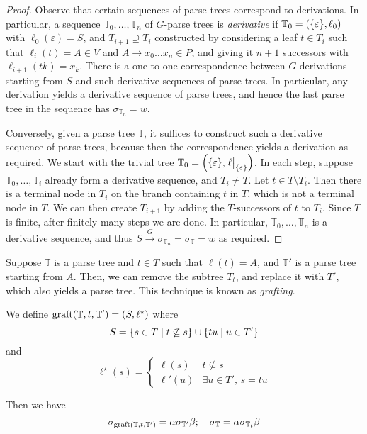 \begin{proof}
	Observe that certain sequences of parse trees correspond to derivations.
	In particular, a sequence \( \mathbb T_0, \dots, \mathbb T_n \) of \( G \)-parse trees is \emph{derivative} if \( \mathbb T_0 = (\qty{\varepsilon}, \ell_0) \) with \( \ell_0(\varepsilon) = S \), and \( T_{i+1} \supseteq T_i \) constructed by considering a leaf \( t \in T_i \) such that \( \ell_i(t) = A \in V \) and \( A \to x_0 \dots x_n \in P \), and giving it \( n + 1 \) successors with \( \ell_{i+1}(tk) = x_k \).
	There is a one-to-one correspondence between \( G \)-derivations starting from \( S \) and such derivative sequences of parse trees.
	In particular, any derivation yields a derivative sequence of parse trees, and hence the last parse tree in the sequence has \( \sigma_{\mathbb T_n} = w \).

	Conversely, given a parse tree \( \mathbb T \), it suffices to construct such a derivative sequence of parse trees, because then the correspondence yields a derivation as required.
	We start with the trivial tree \( \mathbb T_0 = \qty(\qty{\varepsilon}, \eval{\ell}_{\qty{\varepsilon}}) \).
	In each step, suppose \( \mathbb T_0, \dots, \mathbb T_i \) already form a derivative sequence, and \( T_i \neq T \).
	Let \( t \in T \setminus T_i \).
	Then there is a terminal node in \( T_i \) on the branch containing \( t \) in \( T \), which is not a terminal node in \( T \).
	We can then create \( T_{i+1} \) by adding the \( T \)-successors of \( t \) to \( T_i \).
	Since \( T \) is finite, after finitely many steps we are done.
	In particular, \( \mathbb T_0, \dots, \mathbb T_n \) is a derivative sequence, and thus \( S \xrightarrow G \sigma_{\mathbb T_n} = \sigma_{\mathbb T} = w \) as required.
\end{proof}
Suppose \( \mathbb T \) is a parse tree and \( t \in T \) such that \( \ell(t) = A \), and \( \mathbb T' \) is a parse tree starting from \( A \).
Then, we can remove the subtree \( T_t \), and replace it with \( T' \), which also yields a parse tree.
This technique is known as \emph{grafting}.
\begin{definition}
	We define \( \operatorname{graft}(\mathbb T, t, \mathbb T') = (S, \ell^\star) \) where
	\[ S = \qty{s \in T \mid t \not\subseteq s} \cup \qty{tu \mid u \in T'} \]
	and
	\[ \ell^\star(s) = \begin{cases}
		\ell(s) & t \not\subseteq s \\
		\ell'(u) & \exists u \in T',\, s = tu
	\end{cases} \]
\end{definition}
Then we have
\[ \sigma_{\operatorname{graft}(\mathbb T, t, \mathbb T')} = \alpha \sigma_{\mathbb T'} \beta;\quad \sigma_{\mathbb T} = \alpha \sigma_{\mathbb T_t} \beta \]

